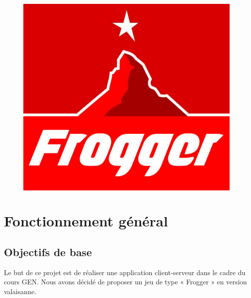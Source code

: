 \documentclass[a4paper,11pt]{article}
\author{\auteur}
\title{\titre}
\date{\today}
\begin{document}
\clearpage\maketitle
\thispagestyle{empty}

	\maketitle
	\begin{figure}[h!]
		\centering
		\includegraphics[scale=0.7]{../Logo/logo.jpg}
	\end{figure}
	\newpage


	\tableofcontents
	\listoffigures
	

	\newpage

	\section{Fonctionnement général}
	\subsection{Objectifs de base}
	Le but de ce projet est de réaliser une application client-serveur dans le cadre du cours GEN. Nous avons décidé de proposer un jeu de type « Frogger » en version valaisanne. \par
\end{document}
